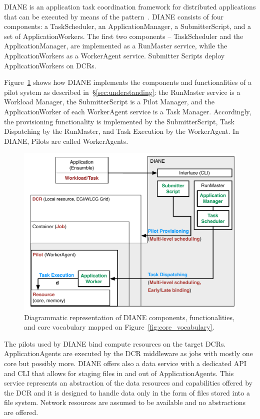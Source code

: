 \documentclass{sig-alternate}
\begin{document}
DIANE is an application task coordination framework for distributed applications
that can be executed by means of the \MW pattern~\cite{Moscicki:908910}. DIANE
consists of four  components: a TaskScheduler, an
ApplicationManager, a SubmitterScript, and a set of ApplicationWorkers. The
first two components -- TaskScheduler and the ApplicationManager, are
implemented as a RunMaster service, while the ApplicationWorkers as a
WorkerAgent service.  Submitter Scripts deploy ApplicationWorkers on DCRs.

Figure~\ref{fig:diane_comparison} shows how DIANE implements the components and
functionalities of a pilot system as described in~\S\ref{sec:understanding}: the
RunMaster service is a Workload Manager, the SubmitterScript is a Pilot Manager,
and the ApplicationWorker of each WorkerAgent service is a Task Manager.
Accordingly, the \pilot provisioning functionality is implemented by the
SubmitterScript, Task Dispatching by the RunMaster, and Task Execution by the
WorkerAgent. In DIANE, Pilots are called WorkerAgents.

\begin{figure}[t]
    \centering
        \includegraphics[width=.48\textwidth]{figures/diane_comparison.pdf}
    \caption{Diagrammatic representation of DIANE components,
    functionalities, and core vocabulary mapped on
    Figure~\ref{fig:core_vocabulary}.}
    \label{fig:diane_comparison}
\end{figure}



The pilots used by DIANE bind compute resources on the target DCRs.
ApplicationAgents are executed by the DCR middleware as jobs with mostly one
core but possibly more. DIANE offers also a data service with a dedicated API
and CLI that allows for staging files in and out of ApplicationAgents. This
service represents an abstraction of the data resources and capabilities offered
by the DCR and it is designed to handle data only in the form of files stored
into a file system. Network resources are assumed to be available and no
abstractions are offered.
\end{document}
